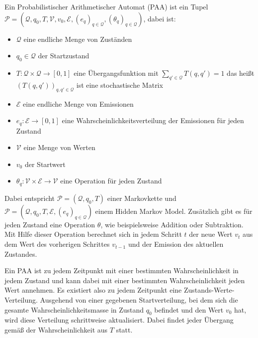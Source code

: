 \begin{definition}[PAA]
 Ein Probabilistischer Arithmetischer Automat (PAA) ist ein Tupel
 $ \mathcal{P} = (\mathcal{Q}, q_0, T, \mathcal{V}, v_0, \mathcal{E}, (e_q)_{q\in\mathcal{Q}}, (\theta_q)_{q\in\mathcal{Q}})$, dabei ist:
 \begin{itemize}
  \item $\mathcal{Q}$ eine endliche Menge von Zuständen
  \item $q_0 \in \mathcal{Q}$ der Startzustand
  \item $T: \mathcal{Q} \times \mathcal{Q} \rightarrow [0,1]$ eine Übergangsfunktion mit $\sum_{q' \in \mathcal{Q}} T(q, q') = 1 $ das heißt $(T(q,q'))_{q,q' \in \mathcal{Q}}$ ist eine stochastische Matrix
  \item $\mathcal{E}$ eine endliche Menge von Emissionen
  \item $e_q: \mathcal{E} \rightarrow [0,1]$ eine Wahrscheinlichkeitsverteilung der Emissionen für jeden Zustand
  \item $\mathcal{V}$ eine Menge von Werten
  \item $v_0$ der Startwert
  \item $\theta_q: \mathcal{V} \times \mathcal{E} \rightarrow \mathcal{V}$ eine Operation für jeden Zustand
 \end{itemize}
\end{definition}
Dabei entspricht $ \mathcal{P} = (\mathcal{Q}, q_0, T)$ einer Markovkette und $ \mathcal{P} = (\mathcal{Q}, q_0, T, \mathcal{E}, (e_q)_{q\in\mathcal{Q}})$ einem Hidden Markov Model. %
Zusätzlich gibt es für jeden Zustand eine Operation $\theta$, wie beispielsweise Addition oder Subtraktion. Mit Hilfe dieser Operation berechnet sich in jedem Schritt $t$ der neue Wert $v_t$ aus dem Wert des vorherigen Schrittes $v_{t-1}$ und der Emission des aktuellen Zustandes.

Ein PAA ist zu jedem Zeitpunkt mit einer bestimmten Wahrscheinlichkeit in jedem Zustand und kann dabei mit einer bestimmten Wahrscheinlichkeit jeden Wert annehmen. Es existiert also zu jedem Zeitpunkt eine Zustands-Werte-Verteilung. Ausgehend von einer gegebenen Startverteilung, bei dem sich die gesamte Wahrscheinlichkeitsmasse in Zustand $q_0$ befindet und den Wert $v_0$ hat, wird diese Verteilung schrittweise aktualisiert. Dabei findet jeder Übergang gemäß der Wahrscheinlichkeit aus $T$ statt. %

% 
% 
% 


